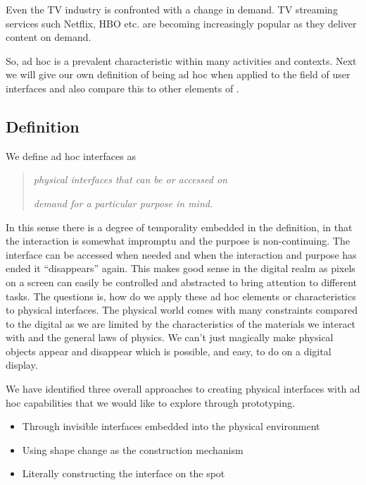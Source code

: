 Even the TV industry is confronted with a change in demand.
TV streaming services such Netflix, HBO etc. are becoming increasingly popular as they deliver content on demand.

So, ad hoc is a prevalent characteristic within many activities and contexts.
Next we will give our own definition of being ad hoc when applied to the field of user interfaces and also compare this to other elements of .

\subsection{Definition} 
We define ad hoc interfaces as 

\begin{quotation}\label{adhoc:definition}
\emph{physical interfaces that can be  or accessed on} 

\emph{demand for a particular purpose in mind. }
\end{quotation}

In this sense there is a degree of temporality embedded in the definition, in that the interaction is somewhat impromptu and the purpose is non-continuing.
The interface can be accessed when needed and when the interaction and purpose has ended it ``disappears'' again.
This makes good sense in the digital realm as pixels on a screen can easily be controlled and abstracted to bring attention to different tasks.
The questions is, how do we apply these ad hoc elements or characteristics to physical interfaces.
The physical world comes with many constraints compared to the digital as we are limited by the characteristics of the materials we interact with and the general laws of physics.
We can't just magically make physical objects appear and disappear which is possible, and easy, to do on a digital display.

We have identified three overall approaches to creating physical interfaces with ad hoc capabilities that we would like to explore through prototyping.

\begin{itemize}
	\item{Through invisible interfaces embedded into the physical environment}
	\item{Using shape change as the construction mechanism}
	\item{Literally constructing the interface on the spot}
\end{itemize}

